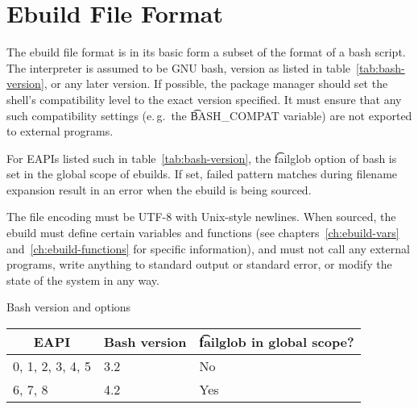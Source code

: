 \chapter{Ebuild File Format}
\label{ch:ebuild-format}

 The ebuild file format is in its basic form a subset of the format of
a bash script. The interpreter is assumed to be GNU bash, version as listed in
table~\ref{tab:bash-version}, or any later version. If possible, the package manager should set
the shell's compatibility level to the exact version specified. It must ensure that any such
compatibility settings (e.\,g.\ the \t{BASH_COMPAT} variable) are not exported to external programs.

 For EAPIs listed such in table~\ref{tab:bash-version}, the \t{failglob}
option of bash is set in the global scope of ebuilds. If set, failed pattern matches during
filename expansion result in an error when the ebuild is being sourced.

The file encoding must be UTF-8 with Unix-style newlines. When sourced, the ebuild must define
certain variables and functions (see chapters~\ref{ch:ebuild-vars} and~\ref{ch:ebuild-functions}
for specific information), and must not call any external programs, write anything to standard
output or standard error, or modify the state of the system in any way.

\begin{centertable}{Bash version and options}
    \label{tab:bash-version}
    \begin{tabular}{lll}
      \toprule
      \multicolumn{1}{c}{\textbf{EAPI}} &
      \multicolumn{1}{c}{\textbf{Bash version}} &
      \multicolumn{1}{c}{\textbf{\t{failglob} in global scope?}} \\
      \midrule
      0, 1, 2, 3, 4, 5  & 3.2 & No  \\
      6, 7, 8           & 4.2 & Yes \\
      \bottomrule
    \end{tabular}
\end{centertable}


